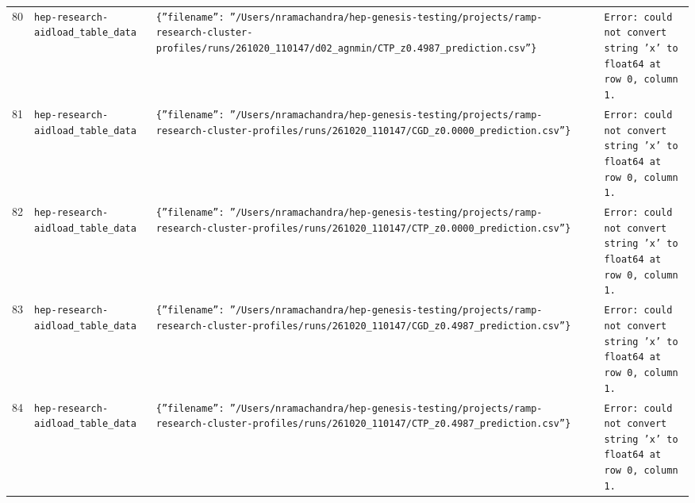 \documentclass[11pt,a4paper]{article}
\begin{document}
\begin{longtable}{@{}p{}p{}p{}p{}@{}}
80 & \texttt{hep-research-aid}\newline\texttt{load\_\allowbreak{}table\_\allowbreak{}data} & \texttt{\{''filename'':\allowbreak{} ''/\allowbreak{}Users/\allowbreak{}nramachandra/\allowbreak{}hep-genesis-testing/\allowbreak{}projects/\allowbreak{}ramp-research-cluster-profiles/\allowbreak{}runs/\allowbreak{}261020\_\allowbreak{}110147/\allowbreak{}d02\_\allowbreak{}agnmin/\allowbreak{}CTP\_\allowbreak{}z0.4987\_\allowbreak{}prediction.csv''\}\allowbreak{}} & \texttt{Error:\allowbreak{} could not convert string 'x' to float64 at row 0,\allowbreak{} column 1.} \\
81 & \texttt{hep-research-aid}\newline\texttt{load\_\allowbreak{}table\_\allowbreak{}data} & \texttt{\{''filename'':\allowbreak{} ''/\allowbreak{}Users/\allowbreak{}nramachandra/\allowbreak{}hep-genesis-testing/\allowbreak{}projects/\allowbreak{}ramp-research-cluster-profiles/\allowbreak{}runs/\allowbreak{}261020\_\allowbreak{}110147/\allowbreak{}CGD\_\allowbreak{}z0.0000\_\allowbreak{}prediction.csv''\}\allowbreak{}} & \texttt{Error:\allowbreak{} could not convert string 'x' to float64 at row 0,\allowbreak{} column 1.} \\
82 & \texttt{hep-research-aid}\newline\texttt{load\_\allowbreak{}table\_\allowbreak{}data} & \texttt{\{''filename'':\allowbreak{} ''/\allowbreak{}Users/\allowbreak{}nramachandra/\allowbreak{}hep-genesis-testing/\allowbreak{}projects/\allowbreak{}ramp-research-cluster-profiles/\allowbreak{}runs/\allowbreak{}261020\_\allowbreak{}110147/\allowbreak{}CTP\_\allowbreak{}z0.0000\_\allowbreak{}prediction.csv''\}\allowbreak{}} & \texttt{Error:\allowbreak{} could not convert string 'x' to float64 at row 0,\allowbreak{} column 1.} \\
83 & \texttt{hep-research-aid}\newline\texttt{load\_\allowbreak{}table\_\allowbreak{}data} & \texttt{\{''filename'':\allowbreak{} ''/\allowbreak{}Users/\allowbreak{}nramachandra/\allowbreak{}hep-genesis-testing/\allowbreak{}projects/\allowbreak{}ramp-research-cluster-profiles/\allowbreak{}runs/\allowbreak{}261020\_\allowbreak{}110147/\allowbreak{}CGD\_\allowbreak{}z0.4987\_\allowbreak{}prediction.csv''\}\allowbreak{}} & \texttt{Error:\allowbreak{} could not convert string 'x' to float64 at row 0,\allowbreak{} column 1.} \\
84 & \texttt{hep-research-aid}\newline\texttt{load\_\allowbreak{}table\_\allowbreak{}data} & \texttt{\{''filename'':\allowbreak{} ''/\allowbreak{}Users/\allowbreak{}nramachandra/\allowbreak{}hep-genesis-testing/\allowbreak{}projects/\allowbreak{}ramp-research-cluster-profiles/\allowbreak{}runs/\allowbreak{}261020\_\allowbreak{}110147/\allowbreak{}CTP\_\allowbreak{}z0.4987\_\allowbreak{}prediction.csv''\}\allowbreak{}} & \texttt{Error:\allowbreak{} could not convert string 'x' to float64 at row 0,\allowbreak{} column 1.} \\

\end{longtable}
\end{document}
